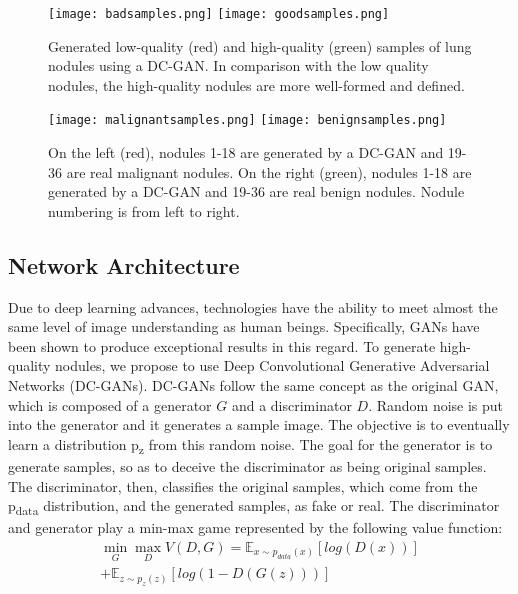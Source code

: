 \documentclass{article}
\begin{document}
\begin{figure*}
\center
\texttt{[image: badsamples.png]}
\texttt{[image: goodsamples.png]}
 \caption{Generated low-quality (red) and high-quality (green) samples of lung nodules using a DC-GAN. In comparison with the low quality nodules, the high-quality nodules are more well-formed and defined.}
 \label{fig:bgsamples}
\end{figure*}

\begin{figure*}
\center
\texttt{[image: malignantsamples.png]}
\texttt{[image: benignsamples.png]}
 \caption{On the left (red), nodules 1-18 are generated by a DC-GAN and 19-36 are real malignant nodules. On the right (green), nodules 1-18 are generated by a DC-GAN and 19-36 are real benign nodules. Nodule numbering is from left to right.}
 \label{fig:classsamples}
\end{figure*}

\vspace{-5 px}
\subsection{Network Architecture}
Due to deep learning advances, technologies have the ability to meet almost the same level of image understanding as human beings. Specifically, GANs have been shown to produce exceptional results in this regard. To generate high-quality nodules, we propose to use Deep Convolutional Generative Adversarial Networks (DC-GANs). DC-GANs follow the same concept as the original GAN, which is composed of a generator $G$ and a discriminator $D$. Random noise is put into the generator and it generates a sample image. The objective is to eventually learn a distribution p\textsubscript{z} from this random noise. The goal for the generator is to generate samples, so as to deceive the discriminator as being original samples. The discriminator, then, classifies the original samples, which come from the p\textsubscript{data} distribution, and the generated samples, as fake or real. The discriminator and generator play a min-max game represented by the following value function:
\begin{equation}
\begin{split}
\min_{G} \max_{D} V(D,G) = \mathbb{E}_{x \sim p_{data}(x)} [log(D(x))] \\ +
\mathbb{E}_{z \sim p_{z}(z)} [log(1-D(G(z)))]
\end{split}
\end{equation}
\end{document}
